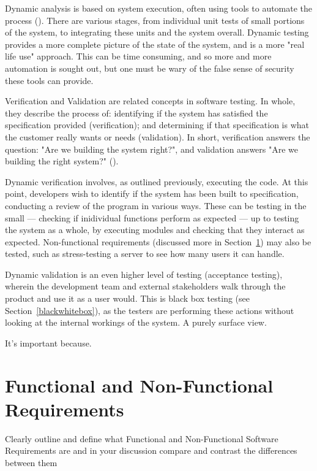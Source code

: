 \documentclass[12pt]{article}
\begin{document}
Dynamic analysis is based on system execution, often using tools to automate the process (). There are various stages, from individual unit tests of small portions of the system, to integrating these units and the system overall. Dynamic testing provides a more complete picture of the state of the system, and is a more "real life use" approach. This can be time consuming, and so more and more automation is sought out, but one must be wary of the false sense of security these tools can provide.

Verification and Validation are related concepts in software testing. In whole, they describe the process of: identifying if the system has satisfied the specification provided (verification); and determining if that specification is what the customer really wants or needs (validation). In short, verification answers the question: "Are we building the system right?", and validation answers "Are we building the right system?" (). 

Dynamic verification involves, as outlined previously, executing the code. At this point, developers wish to identify if the system has been built to specification, conducting a review of the program in various ways. These can be testing in the small --- checking if inidividual functions perform as expected --- up to testing the system as a whole, by executing modules and checking that they interact as expected. Non-functional requirements (discussed more in Section~\ref{reqs}) may also be tested, such as stress-testing a server to see how many users it can handle.

Dynamic validation is an even higher level of testing (acceptance testing), wherein the development team and external stakeholders walk through the product and use it as a user would. This is black box testing (see Section~\ref{blackwhitebox}), as the testers are performing these actions without looking at the internal workings of the system. A purely surface view.

It's important because.



\section{Functional and Non-Functional Requirements} \label{reqs}
Clearly outline and define what Functional and Non-Functional Software Requirements are and in your discussion compare and contrast the differences between them
\end{document}
